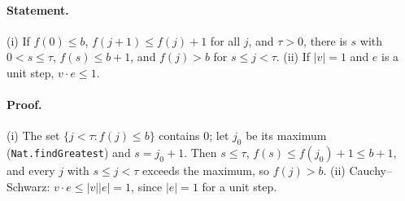 \paragraph{Statement.} (i) If $f(0)\le b$, $f(j+1)\le f(j)+1$ for all $j$, and $\tau>0$, there is
$s$ with $0<s\le\tau$, $f(s)\le b+1$, and $f(j)>b$ for $s\le j<\tau$. (ii) If $|v|=1$ and $e$ is a
unit step, $v\cdot e\le1$.
\paragraph{Proof.} (i) The set $\{j<\tau: f(j)\le b\}$ contains $0$; let $j_0$ be its maximum
(\texttt{Nat.findGreatest}) and $s=j_0+1$. Then $s\le\tau$, $f(s)\le f(j_0)+1\le b+1$, and every
$j$ with $s\le j<\tau$ exceeds the maximum, so $f(j)>b$. (ii) Cauchy--Schwarz:
$v\cdot e\le|v||e|=1$, since $|e|=1$ for a unit step.
